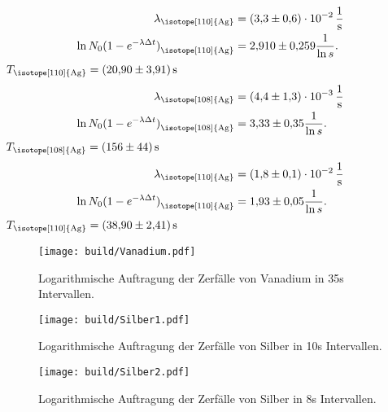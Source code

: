\begin{align*}
  \lambda_\text{\isotope[110]{Ag}}&=\qty{3.3(0.6)e-2}{\per\s}\\
  \ln{N_0(1-e^{-\lambda \Delta t})}_\text{\isotope[110]{Ag}}&=\num{2.91(0.259)}\frac{1}{\ln{s}}.
\end{align*}
$T_\text{\isotope[110]{Ag}}=\qty{20.9(3.91)}{\second}$
\begin{align*}
  \lambda_\text{\isotope[108]{Ag}}&=\qty{4.4(1.3)e-3}{\per\s}\\
  \ln{N_0(1-e^{-\lambda \Delta t})}_\text{\isotope[108]{Ag}}&=\num{3.33(0.35)}\frac{1}{\ln{s}}.
\end{align*}
$T_\text{\isotope[108]{Ag}}=\qty{156(44)}{\second}$
\begin{align*}
  \lambda_\text{\isotope[110]{Ag}}&=\qty{1.8(0.1)e-2}{\per\s}\\
  \ln{N_0(1-e^{-\lambda \Delta t})}_\text{\isotope[110]{Ag}}&=\num{1.93(0.05)}\frac{1}{\ln{s}}.
\end{align*}
$T_\text{\isotope[110]{Ag}}=\qty{38.9(2.41)}{\second}$
\begin{figure}[H]
  \centering
  \texttt{[image: build/Vanadium.pdf]}
  \caption{Logarithmische Auftragung der Zerfälle von Vanadium in 35s Intervallen.}
  \label{fig:Van}
\end{figure}

\begin{figure}[H]
  \centering
  \texttt{[image: build/Silber1.pdf]}
  \caption{Logarithmische Auftragung der Zerfälle von Silber in 10s Intervallen.}
  \label{fig:Si1}
\end{figure}

\begin{figure}[H]
  \centering
  \texttt{[image: build/Silber2.pdf]}
  \caption{Logarithmische Auftragung der Zerfälle von Silber in 8s Intervallen.}
  \label{fig:Si2}
\end{figure}

